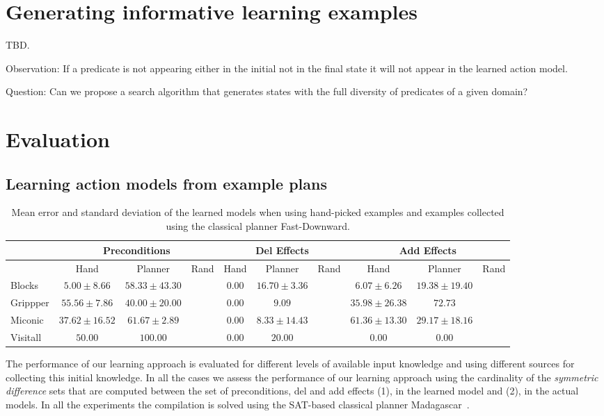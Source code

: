 \documentclass[letterpaper]{article} %
\begin{document}
\section{Generating informative learning examples}
TBD.

Observation: If a predicate is not appearing either in the initial not in the final state it will not appear in the learned action model.

Question: Can we propose a search algorithm that generates states with the full diversity of predicates of a given domain? 


\section{Evaluation}

\subsection{Learning action models from example plans}
\begin{table*}[!hbt]
\begin{footnotesize}
\begin{tabular}{l||c|c|c||c|c|c||c|c|c}
 & \multicolumn{3}{c||}{Preconditions} & \multicolumn{3}{c||}{Del Effects} & \multicolumn{3}{c}{Add Effects} \\\hline
 & Hand & Planner & Rand & Hand & Planner & Rand & Hand & Planner & Rand \\\hline
Blocks & $5.00\pm 8.66$ & $58.33\pm 43.30$ & & $0.00$ & $16.70\pm 3.36$ & & $6.07\pm 6.26$ & $19.38\pm 19.40$&\\
Grippper & $55.56\pm 7.86$ & $40.00\pm 20.00$ & & $0.00$ & $9.09$ & & $35.98\pm 26.38$ & $72.73$&\\
Miconic & $37.62\pm 16.52$ & $61.67\pm 2.89$ & & $0.00$ & $8.33\pm 14.43$ & & $61.36\pm 13.30$ & $29.17\pm 18.16$&\\
Visitall & $50.00$ & $100.00$ & & $0.00$ & $20.00$ & & $0.00$ & $0.00$&
\end{tabular}
\end{footnotesize}
\caption{\small Mean error and standard deviation of the learned models when using hand-picked examples and examples collected using the classical planner Fast-Downward.}
  \label{tab:eplans}
\end{table*}

The performance of our learning approach is evaluated for different levels of available input knowledge and using different sources for collecting this initial knowledge. In all the cases we assess the performance of our learning approach using the cardinality of the {\em symmetric difference} sets that are computed between the set of preconditions, del and add effects (1), in the learned model and (2), in the actual models. In all the experiments the compilation is solved using the SAT-based classical planner {\sc Madagascar}~\cite{rintanen2014madagascar}.
\end{document}
